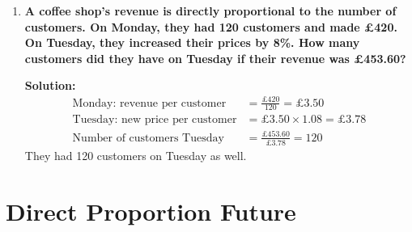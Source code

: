 \documentclass[12pt]{article}
\begin{document}
\begin{enumerate}
    \textbf{Solution:}
    \begin{align*}
        \text{Original price per litre} &= \frac{£68.00}{40} = £1.70 \\
        \text{New price per litre} &= £1.70 \times 1.05 = £1.785 \\
        \text{Cost for 25 litres} &= 25 \times £1.785 = £44.625 \approx £44.63
    \end{align*}
    
    \item \textbf{A coffee shop's revenue is directly proportional to the number of customers. On Monday, they had 120 customers and made £420. On Tuesday, they increased their prices by 8\%. How many customers did they have on Tuesday if their revenue was £453.60?}
    
    \textbf{Solution:}
    \begin{align*}
        \text{Monday: revenue per customer} &= \frac{£420}{120} = £3.50 \\
        \text{Tuesday: new price per customer} &= £3.50 \times 1.08 = £3.78 \\
        \text{Number of customers Tuesday} &= \frac{£453.60}{£3.78} = 120
    \end{align*}
    They had 120 customers on Tuesday as well.
\end{enumerate}

\section*{Direct Proportion Future}
\end{document}
